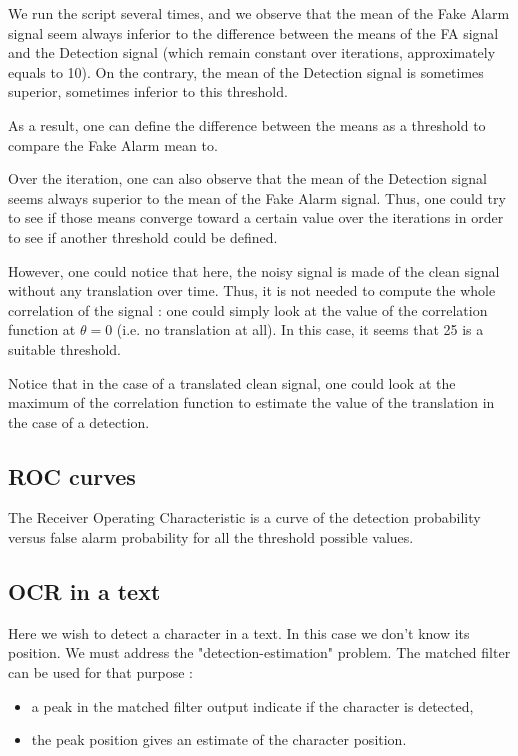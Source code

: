 We run the script several times, and we observe that the mean of the Fake Alarm signal seem always inferior to the difference between the means of the FA signal and the Detection signal (which remain constant over iterations, approximately equals to 10). On the contrary, the mean of the Detection signal is sometimes superior, sometimes inferior to this threshold.

As a result, one can define the difference between the means as a threshold to compare the Fake Alarm mean to.

Over the iteration, one can also observe that the mean of the Detection signal seems always superior to the mean of the Fake Alarm signal. Thus, one could try to see if those means converge toward a certain value over the iterations in order to see if another threshold could be defined.

However, one could notice that here, the noisy signal is made of the clean signal without any translation over time. Thus, it is not needed to compute the whole correlation of the signal : one could simply look at the value of the correlation function at $\theta = 0 $ (i.e. no translation at all). In this case, it seems that 25 is a suitable threshold.

Notice that in the case of a translated clean signal, one could look at the maximum of the correlation function to estimate the value of the translation in the case of a detection.

\subsection{ROC curves}
The Receiver Operating Characteristic is a curve of the detection probability versus false alarm probability for all the threshold possible values.

\subsection{OCR in a text}
Here we wish to detect a character in a text. In this case we don't know its position. We must address the "detection-estimation" problem. The matched filter can be used for that purpose :
\begin{itemize}
    \item a peak in the matched filter output indicate if the character is detected,
    \item the peak position gives an estimate of the character position.
\end{itemize}

